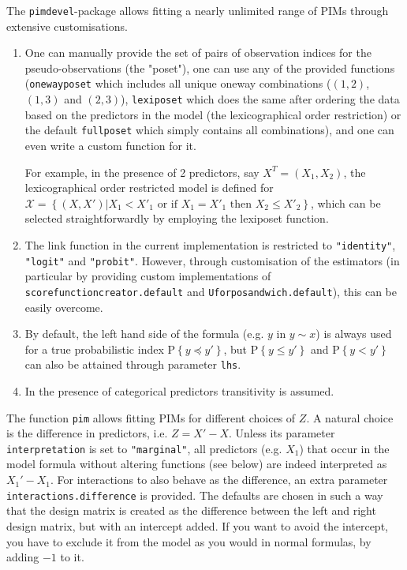 \documentclass[12pt]{article}
\newcommand{\prob}[1]{\text{P}\left\{#1\right\}}
\newcommand{\leqs}{\preccurlyeq}
\newcommand{\pim}[1]{\texttt{#1}}%
\newcommand{\cd}[1]{\texttt{#1}}%
\begin{document}
The \pim{pimdevel}-package allows fitting a nearly unlimited range of PIMs through extensive customisations.
\begin{enumerate}
\item One can manually provide the set of pairs of observation indices for the pseudo-observations (the "poset"), one can use any of the provided functions (\pim{onewayposet} which includes all unique oneway combinations ($(1,2)$, $(1,3)$ and $(2,3)$), \pim{lexiposet} which does the same after ordering the data based on the predictors in the model (the lexicographical order restriction) or the default \pim{fullposet} which simply contains all combinations), and one can even write a custom function for it.

For example, in the presence of 2 predictors, say $X^T = (X_1, X_2)$, the lexicographical order restricted model is defined for $\mathcal{X} = \left\{ (X,X') | X_1 < X'_1 \text{ or if } X_1 = X'_1 \text{ then } X_2 \leq X'_2 \right\}$, which can be selected straightforwardly by employing the lexiposet function. 
\item The link function in the current implementation is restricted to \cd{"identity"}, \cd{"logit"} and \cd{"probit"}. However, through customisation of the estimators (in particular by providing custom implementations of \pim{scorefunctioncreator.default} and \pim{Uforposandwich.default}), this can be easily overcome.
\item By default, the left hand side of the formula (e.g. $y$ in $y\sim x$) is always used for a true probabilistic index $\prob{y \leqs y' }$, but $\prob{y \leq y' }$ and $\prob{y < y' }$ can also be attained through parameter \cd{lhs}.
\item In the presence of categorical predictors transitivity is assumed.
\end{enumerate} 

The function \pim{pim} allows fitting PIMs for different choices of $Z$. A natural choice is the difference in predictors, i.e. $Z = X' - X$. Unless its parameter \cd{interpretation} is set to \cd{"marginal"}, all predictors (e.g. $X_1$) that occur in the model formula without altering functions (see below) are indeed interpreted as $X_1' - X_1$. For interactions to also behave as the difference, an extra parameter \cd{interactions.difference} is provided. The defaults are chosen in such a way that the design matrix is created as the difference between the left and right design matrix, but with an intercept added. If you want to avoid the intercept, you have to exclude it from the model as you would in normal formulas, by adding $-1$ to it.
\end{document}

